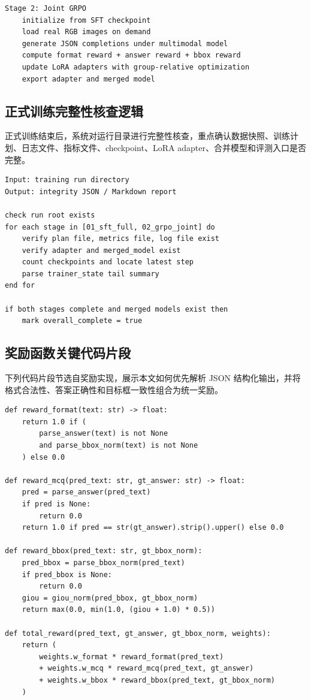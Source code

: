 \begin{thesisappendix}
\begin{verbatim}
Stage 2: Joint GRPO
    initialize from SFT checkpoint
    load real RGB images on demand
    generate JSON completions under multimodal model
    compute format reward + answer reward + bbox reward
    update LoRA adapters with group-relative optimization
    export adapter and merged model
\end{verbatim}

\subsection{正式训练完整性核查逻辑}

正式训练结束后，系统对运行目录进行完整性核查，重点确认数据快照、训练计划、日志文件、指标文件、checkpoint、LoRA adapter、合并模型和评测入口是否完整。

\begin{verbatim}
Input: training run directory
Output: integrity JSON / Markdown report

check run root exists
for each stage in [01_sft_full, 02_grpo_joint] do
    verify plan file, metrics file, log file exist
    verify adapter and merged_model exist
    count checkpoints and locate latest step
    parse trainer_state tail summary
end for

if both stages complete and merged models exist then
    mark overall_complete = true
\end{verbatim}

\subsection{奖励函数关键代码片段}
\label{app:reward-code}

下列代码片段节选自奖励实现，展示本文如何优先解析 JSON 结构化输出，并将格式合法性、答案正确性和目标框一致性组合为统一奖励。
\begin{verbatim}
def reward_format(text: str) -> float:
    return 1.0 if (
        parse_answer(text) is not None
        and parse_bbox_norm(text) is not None
    ) else 0.0

def reward_mcq(pred_text: str, gt_answer: str) -> float:
    pred = parse_answer(pred_text)
    if pred is None:
        return 0.0
    return 1.0 if pred == str(gt_answer).strip().upper() else 0.0

def reward_bbox(pred_text: str, gt_bbox_norm):
    pred_bbox = parse_bbox_norm(pred_text)
    if pred_bbox is None:
        return 0.0
    giou = giou_norm(pred_bbox, gt_bbox_norm)
    return max(0.0, min(1.0, (giou + 1.0) * 0.5))

def total_reward(pred_text, gt_answer, gt_bbox_norm, weights):
    return (
        weights.w_format * reward_format(pred_text)
        + weights.w_mcq * reward_mcq(pred_text, gt_answer)
        + weights.w_bbox * reward_bbox(pred_text, gt_bbox_norm)
    )
\end{verbatim}

\end{thesisappendix}
